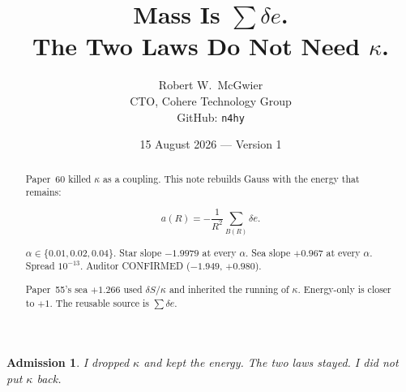 \documentclass[11pt]{article}
\title{\textbf{Mass Is $\sum\delta e$.\\
The Two Laws Do Not Need $\kappa$.}}
\author{Robert W.\ McGwier\\
\small CTO, Cohere Technology Group\\
\small GitHub: \texttt{n4hy}}
\date{15 August 2026 --- Version 1}
\newtheorem*{admission}{Admission}
\begin{document}
\maketitle

\begin{abstract}
\noindent
Paper~60 killed $\kappa$ as a coupling. This note
rebuilds Gauss with the energy that remains:

\[
a(R)=-\frac{1}{R^2}\sum_{B(R)}\delta e.
\]

$\alpha\in\{0.01,0.02,0.04\}$. Star slope $-1.9979$
at every $\alpha$. Sea slope $+0.967$ at every
$\alpha$. Spread $10^{-13}$. Auditor CONFIRMED
($-1.949$, $+0.980$).

Paper~55's sea $+1.266$ used $\delta S/\kappa$ and
inherited the running of $\kappa$. Energy-only is
closer to $+1$. The reusable source is $\sum\delta e$.
\end{abstract}

\begin{admission}
I dropped $\kappa$ and kept the energy. The two laws
stayed. I did not put $\kappa$ back.
\end{admission}
\end{document}
